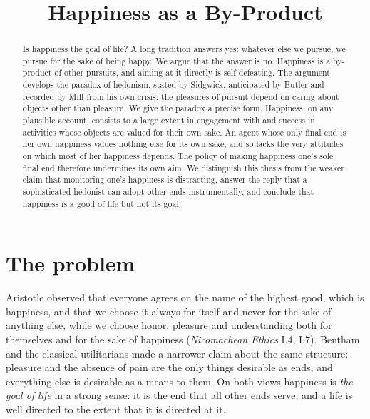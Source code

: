 \documentclass{situationist-preprint}
\title{Happiness as a By-Product}
\begin{document}
\maketitle

\begin{abstract}
Is happiness the goal of life? A long tradition answers yes: whatever else we pursue, we pursue for the sake of being happy. We argue that the answer is no. Happiness is a by-product of other pursuits, and aiming at it directly is self-defeating. The argument develops the paradox of hedonism, stated by Sidgwick, anticipated by Butler and recorded by Mill from his own crisis: the pleasures of pursuit depend on caring about objects other than pleasure. We give the paradox a precise form. Happiness, on any plausible account, consists to a large extent in engagement with and success in activities whose objects are valued for their own sake. An agent whose only final end is her own happiness values nothing else for its own sake, and so lacks the very attitudes on which most of her happiness depends. The policy of making happiness one's sole final end therefore undermines its own aim. We distinguish this thesis from the weaker claim that monitoring one's happiness is distracting, answer the reply that a sophisticated hedonist can adopt other ends instrumentally, and conclude that happiness is a good of life but not its goal.
\end{abstract}

\section{The problem}

Aristotle observed that everyone agrees on the name of the highest good, which is happiness, and that we choose it always for itself and never for the sake of anything else, while we choose honor, pleasure and understanding both for themselves and for the sake of happiness (\emph{Nicomachean Ethics} I.4, I.7). Bentham and the classical utilitarians made a narrower claim about the same structure: pleasure and the absence of pain are the only things desirable as ends, and everything else is desirable as a means to them. On both views happiness is \emph{the goal of life} in a strong sense: it is the end that all other ends serve, and a life is well directed to the extent that it is directed at it.
\end{document}
